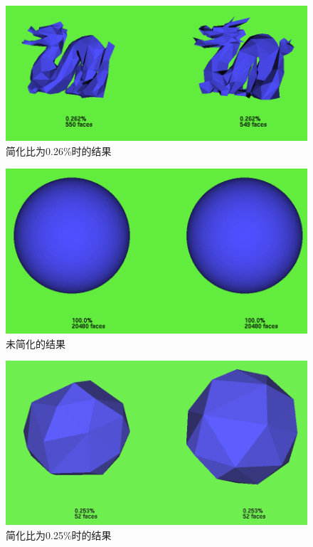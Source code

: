 \begin{figure}[!htbp]
    \centering
    \includegraphics[width=\columnwidth]{0.262.png}
    \caption{简化比为0.26\%时的结果}
    \label{fig:sim3}
\end{figure}

\begin{figure}[!htbp]
    \centering
    \includegraphics[width=\columnwidth]{100_2.png}
    \caption{未简化的结果}
    \label{fig:org2}
\end{figure}

\begin{figure}[!htbp]
    \centering
    \includegraphics[width=\columnwidth]{0.253_2.png}
    \caption{简化比为0.25\%时的结果}
    \label{fig:sim4}
\end{figure}

